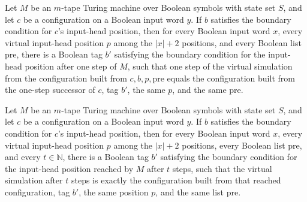 \begin{theorem}
\label{Turing.vhostEmitTM_step}
\leanok
{}
Let $M$ be an $m$-tape Turing machine over Boolean symbols with state set $S$, and let
$c$ be a configuration on a Boolean input word $y$. If $b$ satisfies the boundary
condition for $c$'s input-head position, then for every Boolean input word $x$, every
virtual input-head position $p$ among the $|x|+2$ positions, and every Boolean list
$\mathrm{pre}$, there is a Boolean tag $b'$ satisfying the boundary condition for the
input-head position after one step of $M$, such that one step of the virtual simulation
from the configuration built from $c,b,p,\mathrm{pre}$ equals the configuration built
from the one-step successor of $c$, tag $b'$, the same $p$, and the same $\mathrm{pre}$.
\end{theorem}

\begin{theorem}
\label{Turing.vhostEmitTM_runFrom}
\leanok
{}
Let $M$ be an $m$-tape Turing machine over Boolean symbols with state set $S$, and let
$c$ be a configuration on a Boolean input word $y$. If $b$ satisfies the boundary
condition for $c$'s input-head position, then for every Boolean input word $x$, every
virtual input-head position $p$ among the $|x|+2$ positions, every Boolean list
$\mathrm{pre}$, and every $t\in\mathbb N$, there is a Boolean tag $b'$ satisfying the
boundary condition for the input-head position reached by $M$ after $t$ steps, such that
the virtual simulation after $t$ steps is exactly the configuration built from that
reached configuration, tag $b'$, the same position $p$, and the same list
$\mathrm{pre}$.
\end{theorem}


